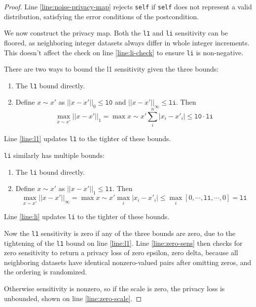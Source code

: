 \documentclass{article}
\begin{document}
\begin{proof}
    Line \ref{line:noise-privacy-map} rejects \texttt{self} if \texttt{self} does not represent a valid distribution,
    satisfying the error conditions of the postcondition.

    We now construct the privacy map.
    Both the \texttt{l1} and \texttt{li} sensitivity can be floored,
    as neighboring integer datasets always differ in whole integer increments.
    This doesn't affect the check on line \ref{line:li-check} to ensure \texttt{li} is non-negative.

    There are two ways to bound the l1 sensitivity given the three bounds:
    \begin{enumerate}
        \item The \texttt{l1} bound directly.
        \item Define $x \sim x'$ as $||x - x'||_0 \leq \texttt{l0}$ and $||x - x'||_\infty \leq \texttt{li}$. Then
        \begin{equation}
            \max_{x \sim x'} ||x - x'||_1 = \max{x \sim x'} \sum^n_i |x_i - x'_i| \leq \texttt{l0} \cdot \texttt{li}
        \end{equation}
    \end{enumerate}
    Line \ref{line:l1} updates \texttt{l1} to the tighter of these bounds.

    \texttt{li} similarly has multiple bounds:
    \begin{enumerate}
        \item The \texttt{li} bound directly.
        \item Define $x \sim x'$ as $||x - x'||_1 \leq \texttt{l1}$. Then
        \begin{equation}
            \max_{x \sim x'} ||x - x'||_\infty = \max{x \sim x'} \max_i |x_i - x'_i| \leq \max_i [0, \cdots, \texttt{l1}, \cdots, 0] = \texttt{l1}
        \end{equation}
    \end{enumerate}
    Line \ref{line:li} updates \texttt{li} to the tighter of these bounds.

    Now the \texttt{l1} sensitivity is zero if any of the three bounds are zero,
    due to the tightening of the \texttt{l1} bound on line \ref{line:l1}.
    Line \ref{line:zero-sens} then checks for zero sensitivity to return a privacy loss of zero epsilon, zero delta,
    because all neighboring datasets have identical nonzero-valued pairs after omitting zeros, and the ordering is randomized.

    Otherwise sensitivity is nonzero, so if the scale is zero,
    the privacy loss is unbounded, shown on line \ref{line:zero-scale}.


\end{proof}
\end{document}
